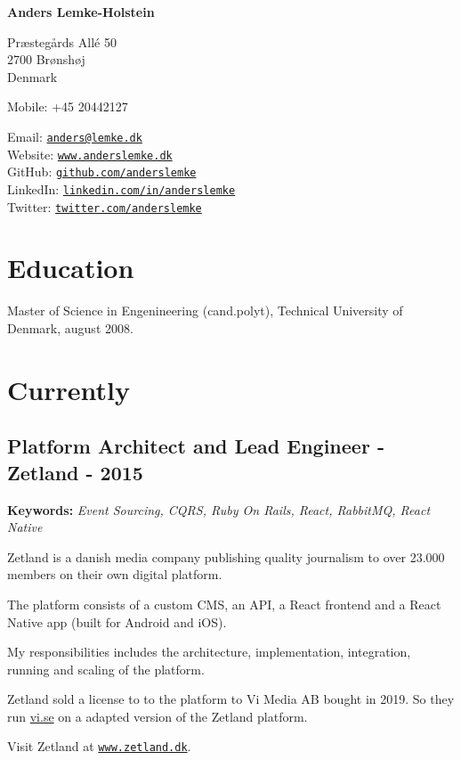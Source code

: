 \documentclass[a4paper]{article}
\newcommand{\keywords}[1]{\small\textbf{Keywords:} \emph{#1}\normalsize}
\begin{document}
{\huge\bf Anders Lemke-Holstein}

\bigskip
Præstegårds Allé 50 \\
2700 Brønshøj \\
Denmark

\medskip

Mobile: +45 20442127

\medskip

Email: \href{mailto:anders@lemke.dk}{\tt anders@lemke.dk} \\
Website: \href{https://www.anderslemke.dk}{\tt www.anderslemke.dk} \\
GitHub: \href{https://www.github.com/anderslemke}{\tt github.com/anderslemke} \\
LinkedIn: \href{https://www.linkedin.com/in/anderslemke}{\tt linkedin.com/in/anderslemke} \\
Twitter: \href{https://www.twitter.com/anderslemke}{\tt twitter.com/anderslemke} 

\section*{Education}
Master of Science in Engenineering (cand.polyt), Technical University of Denmark, august 2008.

\section*{Currently}

\subsection*{Platform Architect and Lead Engineer - Zetland - 2015}
\keywords{Event Sourcing, CQRS, Ruby On Rails, React, RabbitMQ, React Native}

Zetland is a danish media company publishing quality journalism to over 23.000 members on their own digital platform.

The platform consists of a custom CMS, an API, a React frontend and a React Native app (built for Android and iOS).

My responsibilities includes the architecture, implementation, integration, running and scaling of the platform.

Zetland sold a license to to the platform to Vi Media AB bought in 2019. So they run \href{https://vi.se}{vi.se} on a adapted version of the Zetland platform.

Visit Zetland at \href{https://www.zetland.dk}{\tt www.zetland.dk}.
\end{document}
